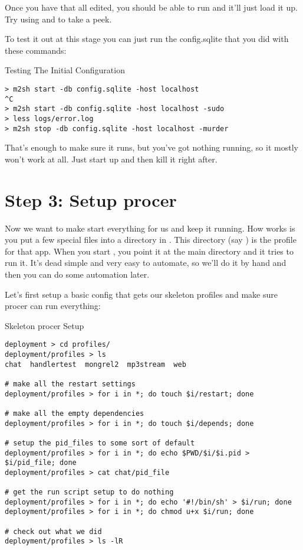 Once you have that all edited, you should be able to run  and it'll just load it up.  Try using
 and  to take a peek.


To test it out at this stage you can just run the config.sqlite that you
did with these commands:

\begin{code}{Testing The Initial Configuration}
\begin{Verbatim}
> m2sh start -db config.sqlite -host localhost
^C
> m2sh start -db config.sqlite -host localhost -sudo
> less logs/error.log
> m2sh stop -db config.sqlite -host localhost -murder
\end{Verbatim}
\end{code}

That's enough to make sure it runs, but you've got nothing running,
so it mostly won't work at all.  Just start up and then kill it
right after.


\section{Step 3: Setup procer}

Now we want to make  start everything for us and keep
it running.  How  works is you put a few special
files into a directory in .  This directory (say )
is the profile for that app.  When you start , you
point it at the main  directory and it tries to run it.
It's dead simple and very easy to automate, so we'll do it by hand
and then you can do some automation later.

Let's first setup a basic config that gets our skeleton profiles
and make sure procer can run everything:

\begin{code}{Skeleton procer Setup}
\begin{Verbatim}
deployment > cd profiles/
deployment/profiles > ls
chat  handlertest  mongrel2  mp3stream  web

# make all the restart settings
deployment/profiles > for i in *; do touch $i/restart; done

# make all the empty dependencies
deployment/profiles > for i in *; do touch $i/depends; done

# setup the pid_files to some sort of default
deployment/profiles > for i in *; do echo $PWD/$i/$i.pid > $i/pid_file; done
deployment/profiles > cat chat/pid_file

# get the run script setup to do nothing
deployment/profiles > for i in *; do echo '#!/bin/sh' > $i/run; done
deployment/profiles > for i in *; do chmod u+x $i/run; done

# check out what we did
deployment/profiles > ls -lR
\end{Verbatim}
\end{code}

